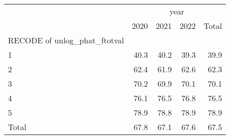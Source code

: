 \begin{tabular}{lllll}
\cline{1-5}
\multicolumn{1}{c}{} &
  \multicolumn{4}{|c}{year} \\
\multicolumn{1}{c}{} &
  \multicolumn{1}{|r}{2020} &
  \multicolumn{1}{r}{2021} &
  \multicolumn{1}{r}{2022} &
  \multicolumn{1}{r}{Total} \\
\cline{1-5}
\multicolumn{1}{l}{RECODE of unlog\_phat\_ftotval} &
  \multicolumn{1}{|r}{} &
  \multicolumn{1}{r}{} &
  \multicolumn{1}{r}{} &
  \multicolumn{1}{r}{} \\
\multicolumn{1}{l}{\hspace{1em}1} &
  \multicolumn{1}{|r}{40.3} &
  \multicolumn{1}{r}{40.2} &
  \multicolumn{1}{r}{39.3} &
  \multicolumn{1}{r}{39.9} \\
\multicolumn{1}{l}{\hspace{1em}2} &
  \multicolumn{1}{|r}{62.4} &
  \multicolumn{1}{r}{61.9} &
  \multicolumn{1}{r}{62.6} &
  \multicolumn{1}{r}{62.3} \\
\multicolumn{1}{l}{\hspace{1em}3} &
  \multicolumn{1}{|r}{70.2} &
  \multicolumn{1}{r}{69.9} &
  \multicolumn{1}{r}{70.1} &
  \multicolumn{1}{r}{70.1} \\
\multicolumn{1}{l}{\hspace{1em}4} &
  \multicolumn{1}{|r}{76.1} &
  \multicolumn{1}{r}{76.5} &
  \multicolumn{1}{r}{76.8} &
  \multicolumn{1}{r}{76.5} \\
\multicolumn{1}{l}{\hspace{1em}5} &
  \multicolumn{1}{|r}{78.9} &
  \multicolumn{1}{r}{78.8} &
  \multicolumn{1}{r}{78.9} &
  \multicolumn{1}{r}{78.9} \\
\multicolumn{1}{l}{\hspace{1em}Total} &
  \multicolumn{1}{|r}{67.8} &
  \multicolumn{1}{r}{67.1} &
  \multicolumn{1}{r}{67.6} &
  \multicolumn{1}{r}{67.5} \\
\cline{1-5}
\end{tabular}
